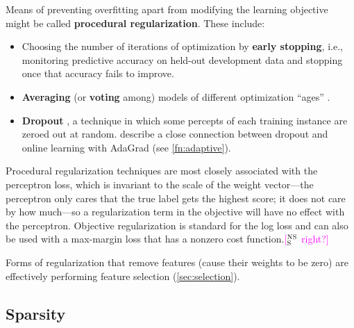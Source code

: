 \documentclass[11pt,letterpaper]{article}
\newcommand{\ensuretext}[1]{#1}
\newcommand{\nssmarker}{\ensuretext{\textcolor{magenta}{\ensuremath{^{\textsc{NS}}_{\textsc{S}}}}}}
\newcommand{\arkcomment}[3]{\ensuretext{\textcolor{#3}{[#1 #2]}}}
\newcommand{\nss}[1]{\arkcomment{\nssmarker}{#1}{magenta}}
\newcommand{\fnref}[1]{\autoref{#1}} %
\begin{document}
Means of preventing overfitting apart from modifying the learning objective might be called \textbf{procedural regularization}. 
These include:
\begin{itemize}
  \item Choosing the number of iterations of optimization by \textbf{early stopping}, i.e., 
  monitoring predictive accuracy on held-out development data and stopping once that accuracy fails to improve.
  \item \textbf{Averaging} (or \textbf{voting} among) models of different optimization ``ages'' \citep{freund-99}.
  \item \textbf{Dropout} \citep{hinton-12,baldi-13}, a technique in which some percepts of each training instance are zeroed out 
  at random. \citet{wager-13} describe a close connection between dropout and online learning with AdaGrad (see \fnref{fn:adaptive}).
\end{itemize}

Procedural regularization techniques are most closely associated with the perceptron loss, 
which is invariant to the scale of the weight vector---the perceptron only cares that the true label gets the highest score; 
it does not care by how much---so a regularization term in the objective will have no effect with the perceptron.
Objective regularization is standard for the log loss 
and can also be used with a max-margin loss that has a nonzero cost function.\nss{right?}

Forms of regularization that remove features (cause their weights to be zero) 
are effectively performing feature selection (\cref{sec:selection}).

\subsection{Sparsity}\label{sec:sparsity}
\end{document}
